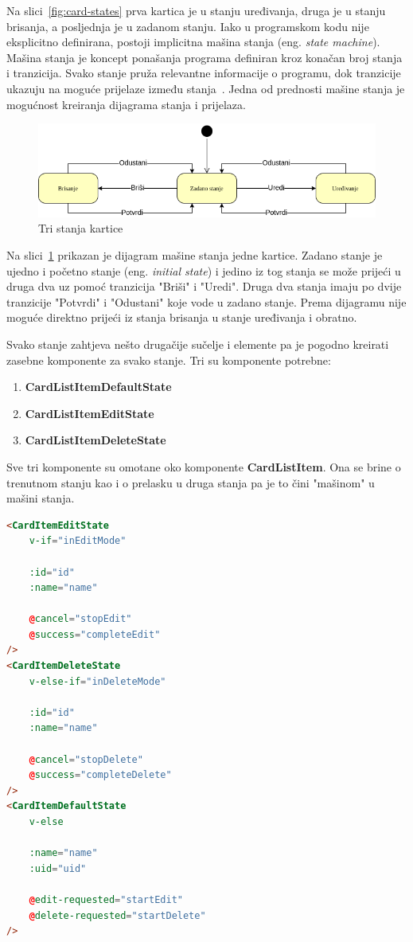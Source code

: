Na slici~\ref{fig:card-states} prva kartica je u stanju uređivanja, druga je u stanju brisanja, a posljednja je u zadanom
stanju.
Iako u programskom kodu nije eksplicitno definirana, postoji implicitna mašina stanja (eng. \textit{state machine}).
Mašina stanja je koncept ponašanja programa definiran kroz konačan broj stanja i tranzicija.
Svako stanje pruža relevantne informacije o programu, dok tranzicije ukazuju na moguće prijelaze između stanja~\cite{state-machine}.
Jedna od prednosti mašine stanja je mogućnost kreiranja dijagrama stanja i prijelaza.

\begin{figure}[h!]
    \centering
    \includegraphics[scale=0.5]{images/card-state-machine}
    \caption{Tri stanja kartice}
    \label{fig:card-state-machine}
\end{figure}

Na slici~\ref{fig:card-state-machine} prikazan je dijagram mašine stanja jedne kartice.
Zadano stanje je ujedno i početno stanje (eng. \textit{initial state}) i jedino iz tog stanja se može prijeći
u druga dva uz pomoć tranzicija "Briši" i "Uredi".
Druga dva stanja imaju po dvije tranzicije "Potvrdi" i "Odustani" koje vode u zadano stanje.
Prema dijagramu nije moguće direktno prijeći iz stanja brisanja u stanje uređivanja i obratno.

Svako stanje zahtjeva nešto drugačije sučelje i elemente pa je pogodno kreirati zasebne komponente za svako stanje.
Tri su komponente potrebne:
\begin{enumerate}
    \item \textbf{CardListItemDefaultState}
    \item \textbf{CardListItemEditState}
    \item \textbf{CardListItemDeleteState}
\end{enumerate}

Sve tri komponente su omotane oko komponente \textbf{CardListItem}.
Ona se brine o trenutnom stanju kao i o prelasku u druga stanja pa je to čini "mašinom" u mašini stanja.

\begin{lstlisting}[language=HTML]
<CardItemEditState
    v-if="inEditMode"

    :id="id"
    :name="name"

    @cancel="stopEdit"
    @success="completeEdit"
/>
<CardItemDeleteState
    v-else-if="inDeleteMode"

    :id="id"
    :name="name"

    @cancel="stopDelete"
    @success="completeDelete"
/>
<CardItemDefaultState
    v-else

    :name="name"
    :uid="uid"

    @edit-requested="startEdit"
    @delete-requested="startDelete"
/>
\end{lstlisting}

